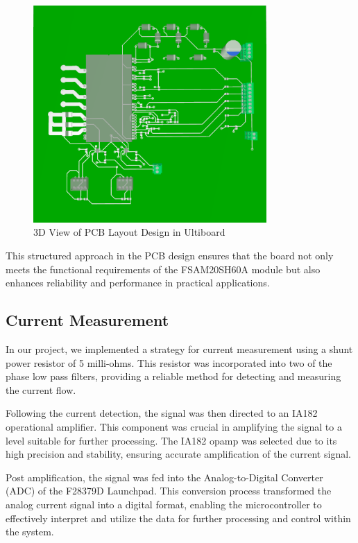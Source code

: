 \begin{figure}[H]
	\centering
	\includegraphics[width=3.5in]{sections/section4/images/PCBDesign/Ultiboard/3DTopView.png}
	\caption{3D View of PCB Layout Design in Ultiboard}
\end{figure}

This structured approach in the PCB design ensures that the board not only meets the functional requirements of the FSAM20SH60A module but also enhances reliability and performance in practical applications.

\subsection{Current Measurement}

In our project, we implemented a strategy for current measurement using a shunt power resistor of 5 milli-ohms. This resistor was incorporated into two of the phase low pass filters, providing a reliable method for detecting and measuring the current flow.

Following the current detection, the signal was then directed to an IA182 operational amplifier. This component was crucial in amplifying the signal to a level suitable for further processing. The IA182 opamp was selected due to its high precision and stability, ensuring accurate amplification of the current signal.

Post amplification, the signal was fed into the Analog-to-Digital Converter (ADC) of the F28379D Launchpad. This conversion process transformed the analog current signal into a digital format, enabling the microcontroller to effectively interpret and utilize the data for further processing and control within the system. 



